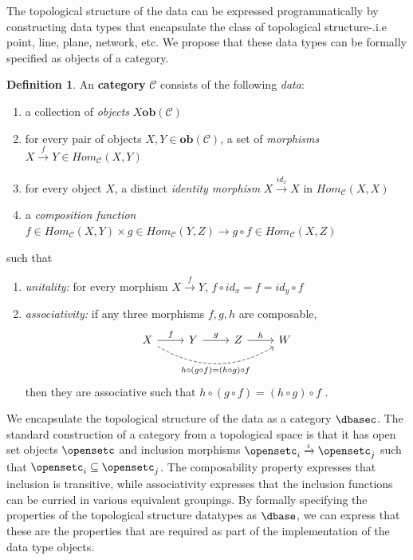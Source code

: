\documentclass[10pt,journal,compsoc]{IEEEtran}
\theoremstyle{definition}
\newtheorem{definition}{Definition}[section]
\theoremstyle{remark}
\begin{document}
The topological structure of the data can be expressed programmatically by constructing data types that encapsulate the class of topological structure-.i.e point, line, plane, network, etc. We propose that these data types can be formally specified as objects of a category. 
\begin{definition}\label{def:atct:category}
   An \textbf{category} $\mathcal{C}$ consists of the following \textit{data}: 
\begin{enumerate}
  \item a collection of \textit{objects} $X \textbf{ob}(\mathcal{C})$
  \item for every pair of objects $X, Y \in \textbf{ob}(\mathcal{C})$, a set of \textit{morphisms} $X \xrightarrow{f} Y \in Hom_{\mathcal{C}}(X, Y)$
  \item for every object $X$, a distinct \textit{identity morphism} $X \xrightarrow {id_x} X$ in $Hom_{\mathcal{C}}(X, X)$
  \item a \textit{composition function} $f \in Hom_{\mathcal{C}}(X, Y) \times  g \in Hom_{\mathcal{C}}(Y, Z) \rightarrow g \circ f \in Hom_{\mathcal{C}}(X, Z)$
\end{enumerate}
such that 
\begin{enumerate}
  \item \textit{unitality:} for every morphism $ X \xrightarrow{f} Y$, $f \circ id_x = f = id_y \circ f$
  \item \textit{associativity:} if any three morphisms $f, g, h$ are composable, 
    \begin{equation*}
      \begin{tikzcd}
        X \arrow[r, "f"] \arrow[rrr, "h\circ(g\circ f) = (h\circ g)\circ f"', bend right, dashed] & Y  \arrow[r, "g"] & Z \arrow[r, "h"] & W
        \end{tikzcd}
  \end{equation*}
  then they are associative such that $h\circ(g\circ f) = (h \circ g) \circ f$  \cite{lawvere2009conceptual,riehlCategoryTheoryContext,maclaneCategoriesWorkingMathematician2013,fongInvitationAppliedCategory2019}. 
  \end{enumerate}
\end{definition}
We encapsulate the topological structure of the data as a category $\mathcal{\dbasec}$. The standard construction of a category from a topological space is that it has open set objects $\opensetc$ and inclusion morphisms $\opensetc_i \xrightarrow{\iota} \opensetc_j$ such that $\opensetc_i \subseteq \opensetc_j$\cite{riehlCategoryTheoryContext}. The composability property expresses that inclusion is transitive, while associativity expresses that the inclusion functions can be curried in various equivalent groupings. By formally specifying the properties of the topological structure datatypes as $\mathcal{\dbase}$, we can express that these are the properties that are required as part of the implementation of the data type objects.  
\end{document}
